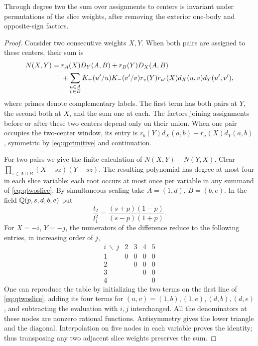 \begin{lemma}\label{lem:twoslicetwo}
Through degree two the sum over assignments to centers is invariant
under permutations of the slice weights, after removing the exterior
one-body and opposite-sign factors.
\end{lemma}
\begin{proof}
Consider two consecutive weights $X,Y$. When both pairs are assigned
to these centers, their sum is
\begin{align}
 N(X,Y)={}&r_A(X)D_Y(A,B)+r_B(Y)D_X(A,B)\notag\\
 &+\sum_{\substack{u\in A\\v\in B}}
 K_+(u'/u)K_-(v'/v) r_v(Y)r_{u'}(X)
                   d_X(u,v)d_Y(u',v'),                      \label{eq:qtwoslice}
\end{align}
where primes denote complementary labels. The first term has both pairs
at $Y$, the second both at $X$, and the sum one at each. The factors
joining assignments before or after these two centers depend only on
their union. When one pair occupies the two-center window, its entry is
$r_b(Y)d_X(a,b)+r_a(X)d_Y(a,b)$, symmetric by \eqref{eq:qprimitive}
and continuation.

For two pairs we give the finite calculation of
$N(X,Y)-N(Y,X)$. Clear $\prod_{z\in A\cup B}(X-sz)(Y-sz)$.
The resulting polynomial has degree at most four in each slice
variable: each root occurs at most once per variable in any summand
of \eqref{eq:qtwoslice}. By simultaneous scaling take $A=(1,d)$,
$B=(b,e)$. In the field $\mathbb Q(p,s,d,b,e)$ put
\[
       \frac{l_2}{l_1^2}=\frac{(s+p)(1-p)}{(s-p)(1+p)} .
\]
For $X=-i$, $Y=-j$, the numerators of the difference reduce to the
following entries, in increasing order of $j$,
\[
\begin{array}{c|cccc}
 i\ \backslash\ j&2&3&4&5\\ \hline
 1&0&0&0&0\\
 2&&0&0&0\\
 3&&&0&0\\
 4&&&&0
\end{array}
\]
One can reproduce the table by initializing the two terms on the first
line of \eqref{eq:qtwoslice}, adding its four terms for
$(u,v)=(1,b),(1,e),(d,b),(d,e)$, and subtracting the evaluation
with $i,j$ interchanged. All the denominators at these nodes are
nonzero rational functions. Antisymmetry gives the lower triangle
and the diagonal. Interpolation on five nodes in each variable proves
the identity; thus transposing any two adjacent slice weights preserves
the sum.
\end{proof}

